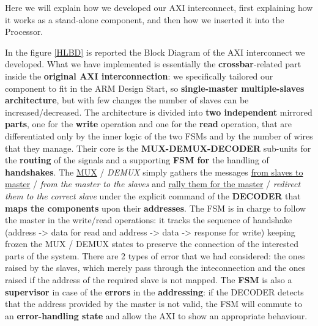 Here we will explain how we developed our AXI interconnect, first explaining how it works as a stand-alone component, and then how we inserted it into the Processor.
\newline

{}
In the figure \ref{HLBD} is reported the Block Diagram of the AXI interconnect we developed.
\newline
What we have implemented is essentially the {\bf crossbar}-related part inside the {\bf original AXI interconnection}: we specifically tailored our component to fit in the ARM Design Start, so {\bf single-master multiple-slaves architecture}, but with few changes the number of slaves can be increased/decreased.
\newline
The architecture is divided into {\bf two independent} mirrored {\bf parts}, one for the {\bf write} operation and one for the {\bf read} operation, that are differentiated only by the inner logic of the two FSMs and by the number of wires that they manage. Their core is the {\bf MUX-DEMUX-DECODER} sub-units for the {\bf routing} of the signals and a supporting {\bf FSM for} the handling of {\bf handshakes}.
\newline
The \underline{MUX} / {\it DEMUX} simply gathers the messages \underline{from slaves to master} / {\it from the master to the slaves} and \underline{rally them for the master} / {\it redirect them to the correct slave} under the explicit command of the {\bf DECODER} that {\bf maps the components} upon their {\bf addresses}.
\newline
The FSM is in charge to follow the master in the write/read operations: it tracks the sequence of handshake (address -> data for read and address -> data -> response for write) keeping frozen the MUX / DEMUX states to preserve the connection of the interested parts of the system.
\newline
There are 2 types of error that we had considered: the ones raised by the slaves, which merely pass through the inteconnection and the ones raised if the address of the required slave is not mapped. The {\bf FSM} is also a {\bf supervisor} in case of the {\bf errors} in the {\bf addressing}: if the DECODER detects that the address provided by the master is not valid, the FSM will commute to an {\bf error-handling state} and allow the AXI to show an appropriate behaviour.
\newline

